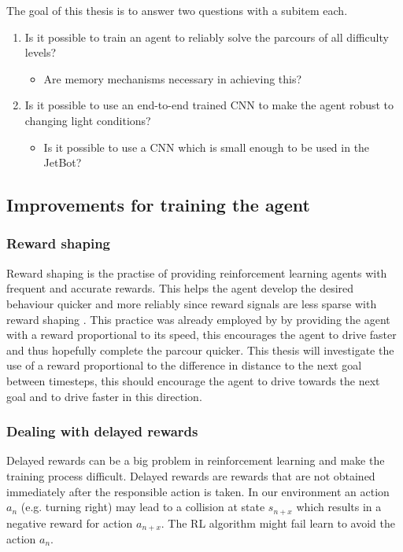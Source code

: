 The goal of this thesis is to answer two questions with a subitem each.
\begin{enumerate}
     \item Is it possible to train an agent to reliably solve the parcours of all difficulty levels?
           \begin{itemize}
                \item Are memory mechanisms necessary in achieving this?
           \end{itemize}
     \item Is it possible to use an end-to-end trained CNN to make the agent robust to changing light conditions?
           \begin{itemize}
                \item Is it possible to use a CNN which is small enough to be used in the JetBot?
           \end{itemize}
\end{enumerate}

\subsection{Improvements for training the agent}

\subsubsection{Reward shaping}

Reward shaping is the practise of providing reinforcement learning agents with frequent and accurate rewards. This helps the agent develop the desired behaviour quicker and more reliably since reward signals are less sparse with reward shaping \autocite{drl_for_ad}. This practice was already employed by \autocite{maximilian} by providing the agent with a reward proportional to its speed, this encourages the agent to drive faster and thus hopefully complete the parcour quicker. This thesis will investigate the use of a reward proportional to the difference in distance to the next goal between timesteps, this should encourage the agent to drive towards the next goal and to drive faster in this direction.


\subsubsection{Dealing with delayed rewards}
Delayed rewards can be a big problem in reinforcement learning and make the training process difficult. Delayed rewards are rewards that are not obtained immediately after the responsible action is taken. In our environment an action \(a_n\) (e.g. turning right) may lead to a collision at state \(s_{n+x}\) which results in a negative reward for action \(a_{n+x}\). The RL algorithm might fail learn to avoid the action \(a_n\).

